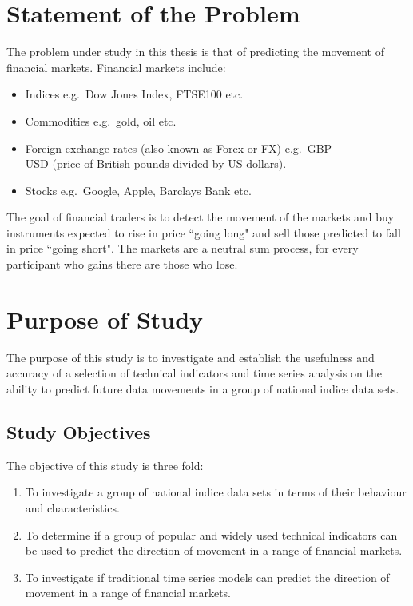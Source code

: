 

\section{Statement of the Problem}
The problem under study in this thesis is that of predicting the movement of financial markets. Financial markets include:
\begin{itemize}
\item Indices e.g.\ Dow Jones Index, FTSE100 etc.
\item Commodities e.g.\ gold, oil etc.
\item Foreign exchange rates (also known as Forex or FX) e.g.\ GBP\\USD (price of British pounds divided by US dollars).
\item Stocks e.g.\ Google, Apple, Barclays Bank etc.
\end{itemize}
The goal of financial traders is to detect the movement of the markets and buy instruments expected to rise in price \textquotedblleft going long" and sell those predicted to fall in price \textquotedblleft going short". The markets are a neutral sum process, for every participant who gains there are those who lose.

\section{Purpose of Study}
The purpose of this study is to investigate and establish the usefulness and accuracy of a selection of technical indicators and time series analysis on the ability to predict future data movements in a group of national indice data sets.

\subsection{Study Objectives}
The objective of this study is three fold:

\begin{enumerate}
\item To investigate a group of national indice data sets in terms of their behaviour and characteristics.
\item To determine if a group of popular and widely used technical indicators can be used to predict the direction of movement in a range of financial markets.
\item To investigate if traditional time series models can predict the direction of movement in a range of financial markets.
\end{enumerate}

